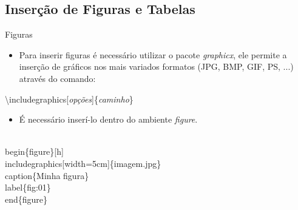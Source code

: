 


\subsection{Inserção de Figuras e Tabelas}

\begin{frame}[fragile]{Figuras}
    \begin{itemize}
    \item Para inserir figuras é necessário utilizar o pacote \textit{graphicx}, ele permite a inserção de gráficos nos mais variados formatos (JPG, BMP, GIF, PS, ...) através do comando:
    \end{itemize}
    
    \alert{\textbackslash includegraphics[\textit{opções}]\{\textit{caminho}\}}

    \begin{itemize}
    \item É necessário inserí-lo dentro do ambiente \textit{figure}.
    \end{itemize}

    \begin{example}
        \begin{semiverbatim}
\small\\begin\{figure\}[h]
\\includegraphics[width=5cm]\{imagem.jpg\}
\\caption\{Minha figura\}
\\label\{fig:01\}
\\end\{figure\}
\end{semiverbatim}
    \end{example}
\end{frame}



